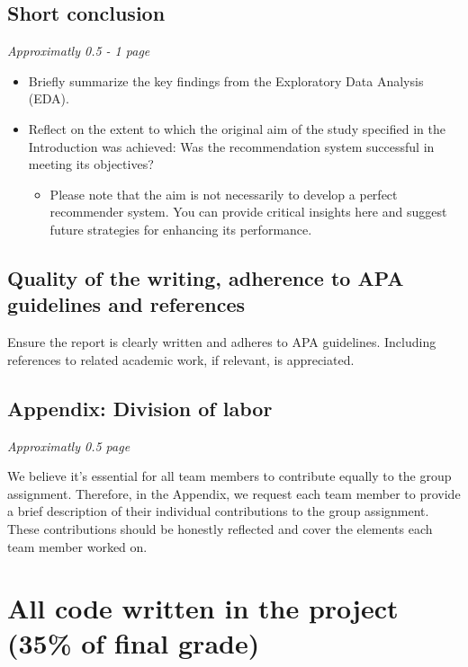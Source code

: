 \subsection{Short conclusion}

\textit{Approximatly 0.5 - 1 page}

\begin{itemize}
	\item Briefly summarize the key findings from the Exploratory Data Analysis (EDA).
	\item Reflect on the extent to which the original aim of the study specified in the Introduction was achieved: Was the recommendation system successful in meeting its objectives?
	\begin{itemize}
	\item Please note that the aim is not necessarily to develop a perfect recommender system. You can provide critical insights here and suggest future strategies for enhancing its performance.
\end{itemize}
\end{itemize}

\subsection{Quality of the writing, adherence to APA guidelines and references}

Ensure the report is clearly written and adheres to APA guidelines. Including references to related academic work, if relevant, is appreciated.

\subsection{Appendix: Division of labor}

\textit{Approximatly 0.5 page}

We believe it's essential for all team members to contribute equally to the group assignment. 
Therefore, in the Appendix, we request each team member to provide a brief description of their individual contributions to the group assignment. These contributions should be honestly reflected and cover the elements each team member worked on.

	
\section{All code written in the project (35\% of final grade)}

